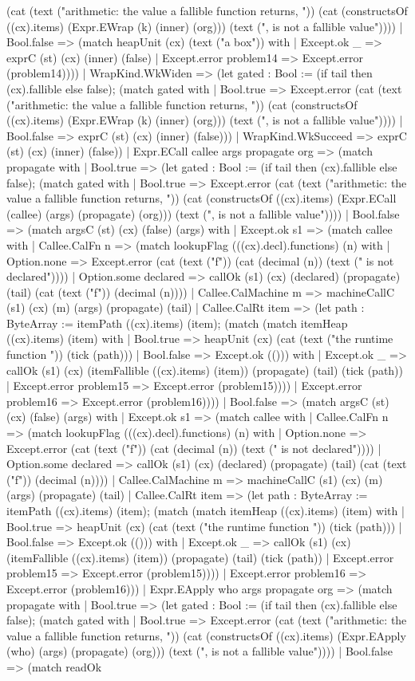 \documentclass[11pt]{article}
\begin{document}
(cat (text ("arithmetic: the value a fallible function returns, ")) (cat (constructsOf ((cx).items) (Expr.EWrap (k) (inner) (org))) (text (", is not a fallible value")))) | Bool.false => (match heapUnit (cx) (text ("a box")) with | Except.ok \_ => exprC (st) (cx) (inner) (false) | Except.error problem14 => Except.error (problem14)))) | WrapKind.WkWiden => (let gated : Bool := (if tail then (cx).fallible else false); (match gated with | Bool.true => Except.error (cat (text ("arithmetic: the value a fallible function returns, ")) (cat (constructsOf ((cx).items) (Expr.EWrap (k) (inner) (org))) (text (", is not a fallible value")))) | Bool.false => exprC (st) (cx) (inner) (false))) | WrapKind.WkSucceed => exprC (st) (cx) (inner) (false)) | Expr.ECall callee args propagate org => (match propagate with | Bool.true => (let gated : Bool := (if tail then (cx).fallible else false); (match gated with | Bool.true => Except.error (cat (text ("arithmetic: the value a fallible function returns, ")) (cat (constructsOf ((cx).items) (Expr.ECall (callee) (args) (propagate) (org))) (text (", is not a fallible value")))) | Bool.false => (match argsC (st) (cx) (false) (args) with | Except.ok s1 => (match callee with | Callee.CalFn n => (match lookupFlag (((cx).decl).functions) (n) with | Option.none => Except.error (cat (text ("f")) (cat (decimal (n)) (text (" is not declared")))) | Option.some declared => callOk (s1) (cx) (declared) (propagate) (tail) (cat (text ("f")) (decimal (n)))) | Callee.CalMachine m => machineCallC (s1) (cx) (m) (args) (propagate) (tail) | Callee.CalRt item => (let path : ByteArray := itemPath ((cx).items) (item); (match (match itemHeap ((cx).items) (item) with | Bool.true => heapUnit (cx) (cat (text ("the runtime function ")) (tick (path))) | Bool.false => Except.ok (())) with | Except.ok \_ => callOk (s1) (cx) (itemFallible ((cx).items) (item)) (propagate) (tail) (tick (path)) | Except.error problem15 => Except.error (problem15)))) | Except.error problem16 => Except.error (problem16)))) | Bool.false => (match argsC (st) (cx) (false) (args) with | Except.ok s1 => (match callee with | Callee.CalFn n => (match lookupFlag (((cx).decl).functions) (n) with | Option.none => Except.error (cat (text ("f")) (cat (decimal (n)) (text (" is not declared")))) | Option.some declared => callOk (s1) (cx) (declared) (propagate) (tail) (cat (text ("f")) (decimal (n)))) | Callee.CalMachine m => machineCallC (s1) (cx) (m) (args) (propagate) (tail) | Callee.CalRt item => (let path : ByteArray := itemPath ((cx).items) (item); (match (match itemHeap ((cx).items) (item) with | Bool.true => heapUnit (cx) (cat (text ("the runtime function ")) (tick (path))) | Bool.false => Except.ok (())) with | Except.ok \_ => callOk (s1) (cx) (itemFallible ((cx).items) (item)) (propagate) (tail) (tick (path)) | Except.error problem15 => Except.error (problem15)))) | Except.error problem16 => Except.error (problem16))) | Expr.EApply who args propagate org => (match propagate with | Bool.true => (let gated : Bool := (if tail then (cx).fallible else false); (match gated with | Bool.true => Except.error (cat (text ("arithmetic: the value a fallible function returns, ")) (cat (constructsOf ((cx).items) (Expr.EApply (who) (args) (propagate) (org))) (text (", is not a fallible value")))) | Bool.false => (match readOk 
\end{document}
